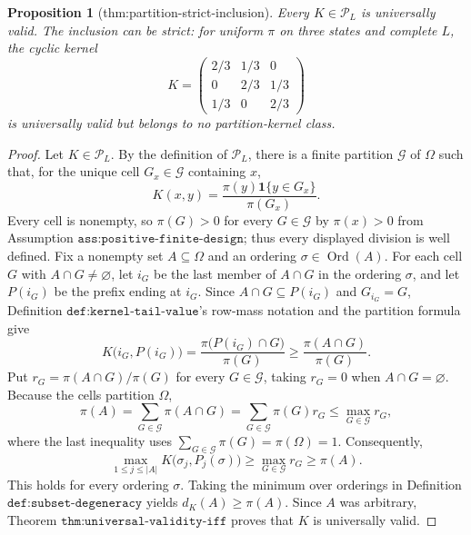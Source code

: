 \documentclass{article}
\newtheorem{proposition}{Proposition}
\begin{document}
\begin{proposition}[thm:partition-strict-inclusion]\label{thm:partition-strict-inclusion}
Every \(K\in\mathcal{P}_L\) is universally valid. The inclusion can be strict: for uniform \(\pi\) on three states and complete \(L\), the cyclic kernel \[K=\begin{pmatrix}2/3&1/3&0\\0&2/3&1/3\\1/3&0&2/3\end{pmatrix}\] is universally valid but belongs to no partition-kernel class.
\end{proposition}
\begin{proof}
Let \(K\in\mathcal P_L\).  By the definition of \(\mathcal P_L\), there is a finite partition \(\mathcal G\) of \(\Omega\) such that, for the unique cell \(G_x\in\mathcal G\) containing \(x\),
\[
K(x,y)=\frac{\pi(y)\mathbf 1\{y\in G_x\}}{\pi(G_x)}.
\]
Every cell is nonempty, so \(\pi(G)>0\) for every \(G\in\mathcal G\) by \(\pi(x)>0\) from Assumption \(\texttt{ass:positive-finite-design}\); thus every displayed division is well defined.  Fix a nonempty set \(A\subseteq\Omega\) and an ordering \(\sigma\in\operatorname{Ord}(A)\).  For each cell \(G\) with \(A\cap G\neq\varnothing\), let \(i_G\) be the last member of \(A\cap G\) in the ordering \(\sigma\), and let \(P(i_G)\) be the prefix ending at \(i_G\).  Since \(A\cap G\subseteq P(i_G)\) and \(G_{i_G}=G\), Definition \(\texttt{def:kernel-tail-value}\)'s row-mass notation and the partition formula give
\[
K\bigl(i_G,P(i_G)\bigr)
=\frac{\pi\bigl(P(i_G)\cap G\bigr)}{\pi(G)}
\geq \frac{\pi(A\cap G)}{\pi(G)}.
\]
Put \(r_G=\pi(A\cap G)/\pi(G)\) for every \(G\in\mathcal G\), taking \(r_G=0\) when \(A\cap G=\varnothing\).  Because the cells partition \(\Omega\),
\[
\pi(A)=\sum_{G\in\mathcal G}\pi(A\cap G)
=\sum_{G\in\mathcal G}\pi(G)r_G
\leq \max_{G\in\mathcal G}r_G,
\]
where the last inequality uses \(\sum_{G\in\mathcal G}\pi(G)=\pi(\Omega)=1\).  Consequently,
\[
\max_{1\leq j\leq |A|}K\bigl(\sigma_j,P_j(\sigma)\bigr)
\geq \max_{G\in\mathcal G}r_G
\geq \pi(A).
\]
This holds for every ordering \(\sigma\).  Taking the minimum over orderings in Definition \(\texttt{def:subset-degeneracy}\) yields \(d_K(A)\geq\pi(A)\).  Since \(A\) was arbitrary, Theorem \(\texttt{thm:universal-validity-iff}\) proves that \(K\) is universally valid.


\end{proof}
\end{document}
